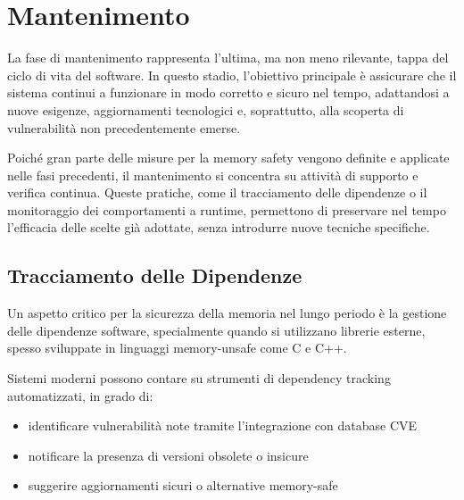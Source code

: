 \section{Mantenimento}
\label{sec:maintenance}

La fase di mantenimento rappresenta l'ultima, ma non meno rilevante, tappa del ciclo
di vita del software. In questo stadio, l'obiettivo principale è assicurare che il
sistema continui a funzionare in modo corretto e sicuro nel tempo, adattandosi a
nuove esigenze, aggiornamenti tecnologici e, soprattutto, alla scoperta di vulnerabilità
non precedentemente emerse.

Poiché gran parte delle misure per la memory safety vengono definite e applicate
nelle fasi precedenti, il mantenimento si concentra su attività di supporto e
verifica continua. Queste pratiche, come il tracciamento delle dipendenze o il
monitoraggio dei comportamenti a runtime, permettono di preservare nel tempo l'efficacia
delle scelte già adottate, senza introdurre nuove tecniche specifiche.

\subsection{Tracciamento delle Dipendenze}
\label{sec:tracciamento-dipendenze}

Un aspetto critico per la sicurezza della memoria nel lungo periodo è la gestione
delle dipendenze software, specialmente quando si utilizzano librerie esterne, spesso
sviluppate in linguaggi memory-unsafe come C e C++.

Sistemi moderni possono contare su strumenti di dependency tracking automatizzati,
in grado di:
\begin{itemize}
  \item identificare vulnerabilità note tramite l'integrazione con database CVE

  \item notificare la presenza di versioni obsolete o insicure

  \item suggerire aggiornamenti sicuri o alternative memory-safe
\end{itemize}

